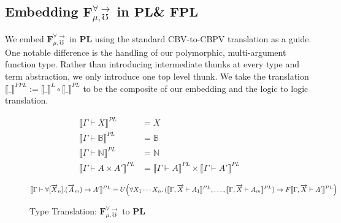 \documentclass[acmsmall]{acmart}
\newcommand{\den}[1]{\llbracket #1\rrbracket}
\newcommand{\source}{$\mathbf{F}_{\mu,\mho}^{\forall\to}\;$}
\newcommand{\pl}{$\mathbf{PL}$}
\newcommand{\fpl}{$\mathbf{FPL}$}
\begin{document}
\subsection{Embedding \source in \pl\;\& \fpl}\label{sec:SourceToPL}

We embed \source in \pl\; using the standard CBV-to-CBPV translation\cite{CBPV} as a guide. One notable difference is the handling of our polymorphic, multi-argument function type. Rather than introducing intermediate thunks at every type and term abstraction, we only introduce one top level thunk. We take the translation $\den{\_}^{FPL}:= \den{\_}^L \circ \den{\_}^{PL}$ to be the composite of our embedding and the logic to logic translation.

\begin{figure}[!htbp]
\centering
\scriptsize
\begin{align*}
\den{\Gamma \vdash X}^{PL} &= X \\
\den{\Gamma \vdash \mathbb{B}}^{PL} &= \mathbb{B} \\
\den{\Gamma \vdash \mathbb{N}}^{PL} &= \mathbb{N} \\
\den{\Gamma \vdash A\times A'}^{PL} &= \den{\Gamma \vdash A}^{PL}\times \den{\Gamma \vdash A'}^{PL} \\
\end{align*}
\[
\den{\Gamma \vdash \forall[\overrightarrow{X}_n].(\overrightarrow{A}_m)\to A'}^{PL}
= U\Bigl(\forall X_1\cdots X_n.\,(\den{\Gamma,\overrightarrow{X}\vdash A_1}^{PL}, \ldots, \den{\Gamma,\overrightarrow{X}\vdash A_m}^{PL}) \to F\den{\Gamma,\overrightarrow{X}\vdash A'}^{PL}\Bigr)
\]
\caption{Type Translation: \source to \pl}
\end{figure}
\end{document}
